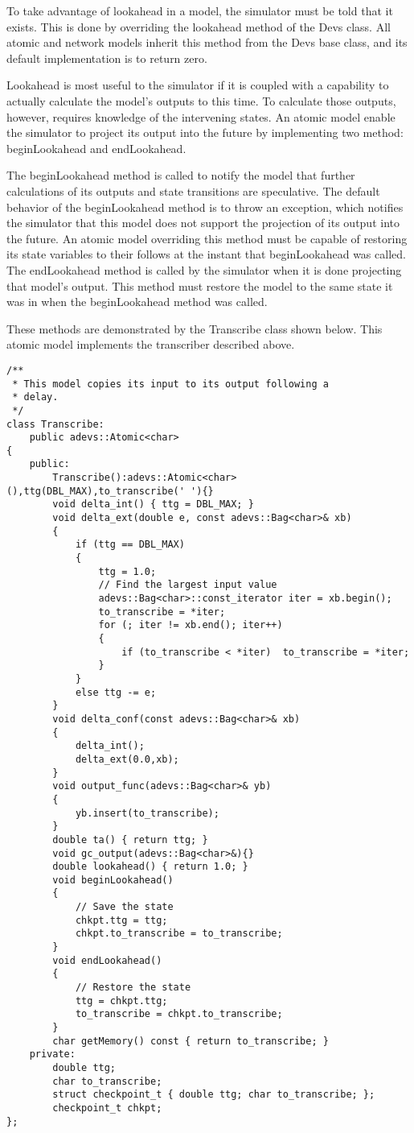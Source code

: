 To take advantage of lookahead in a model, the simulator must be told that it exists. This is done by overriding the lookahead method of the Devs class. All atomic and network models inherit this method from the Devs base class, and its default implementation is to return zero. 

Lookahead is most useful to the simulator if it is coupled with a capability to actually calculate the model's outputs to this time. To calculate those outputs, however, requires knowledge of the intervening states. An atomic model enable the simulator to project its output into the future by implementing two method: beginLookahead and endLookahead.

The beginLookahead method is called to notify the model that further calculations of its outputs and state transitions are speculative. The default behavior of the beginLookahead method is to throw an exception, which notifies the simulator that this model does not support the projection of its output into the future. An atomic model overriding this method must be capable of restoring its state variables to their follows at the instant that beginLookahead was called. The endLookahead method is called by the simulator when it is done projecting that model's output. This method must restore the model to the same state it was in when the beginLookahead method was called.

These methods are demonstrated by the Transcribe class shown below. This atomic model implements the transcriber described above.
\begin{verbatim}
/**
 * This model copies its input to its output following a
 * delay.
 */
class Transcribe:
	public adevs::Atomic<char>
{
	public:
		Transcribe():adevs::Atomic<char>(),ttg(DBL_MAX),to_transcribe(' '){}
		void delta_int() { ttg = DBL_MAX; }
		void delta_ext(double e, const adevs::Bag<char>& xb)
		{
			if (ttg == DBL_MAX)
			{
				ttg = 1.0;
				// Find the largest input value
				adevs::Bag<char>::const_iterator iter = xb.begin();
				to_transcribe = *iter;
				for (; iter != xb.end(); iter++)
				{
					if (to_transcribe < *iter)  to_transcribe = *iter;
				}
			}
			else ttg -= e;
		}
		void delta_conf(const adevs::Bag<char>& xb)
		{
			delta_int();
			delta_ext(0.0,xb);
		}
		void output_func(adevs::Bag<char>& yb)
		{
			yb.insert(to_transcribe);
		}
		double ta() { return ttg; }
		void gc_output(adevs::Bag<char>&){}
		double lookahead() { return 1.0; }
		void beginLookahead()
		{
			// Save the state
			chkpt.ttg = ttg;
			chkpt.to_transcribe = to_transcribe;
		} 
		void endLookahead()
		{
			// Restore the state
			ttg = chkpt.ttg;
			to_transcribe = chkpt.to_transcribe;
		} 
		char getMemory() const { return to_transcribe; }
	private:
		double ttg;
		char to_transcribe;
		struct checkpoint_t { double ttg; char to_transcribe; };
		checkpoint_t chkpt;
};
\end{verbatim}

